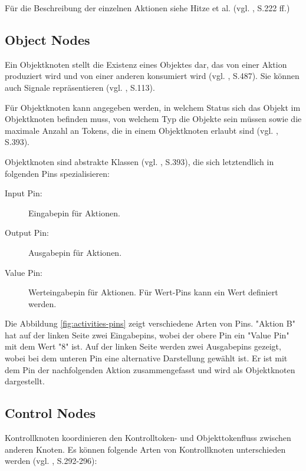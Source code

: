 Für die Beschreibung der einzelnen Aktionen siehe Hitze et al. (vgl. \citep{HitzEtAl2005}, S.222 ff.)


\subsection{Object Nodes}
Ein Objektknoten stellt die Existenz eines Objektes dar, das von einer Aktion produziert wird und von einer anderen konsumiert wird (vgl. \citep{RumbaughJacobsonBooch2005}, S.487). Sie können auch Signale repräsentieren (vgl. \citep{PilonePitman2005}, S.113).

Für Objektknoten kann angegeben werden, in welchem Status sich das Objekt im Objektknoten befinden muss, von welchem Typ die Objekte sein müssen sowie die maximale Anzahl an Tokens, die in einem Objektknoten erlaubt sind (vgl. \citep{OMG2009}, S.393).

Objektknoten sind abstrakte Klassen (vgl. \citep{OMG2009}, S.393), die sich letztendlich in folgenden Pins spezialisieren:
\begin{description}
\item[Input Pin:] Eingabepin für Aktionen.
\item[Output Pin:] Ausgabepin für Aktionen.
\item[Value Pin:] Werteingabepin für Aktionen. Für Wert-Pins kann ein Wert definiert werden.
\end{description}

Die Abbildung \ref{fig:activities-pins} zeigt verschiedene Arten von Pins. "Aktion B" hat auf der linken Seite zwei Eingabepins, wobei der obere Pin ein "Value Pin" mit dem Wert "8" ist. Auf der linken Seite werden zwei Ausgabepins gezeigt, wobei bei dem unteren Pin eine alternative Darstellung gewählt ist. Er ist mit dem Pin der nachfolgenden Aktion zusammengefasst und wird als Objektknoten dargestellt.



\subsection{Control Nodes}
Kontrollknoten koordinieren den Kontrolltoken- und Objekttokenfluss zwischen anderen Knoten. Es können folgende Arten von Kontrollknoten unterschieden werden (vgl. \citep{RumbaughJacobsonBooch2005}, S.292-296):

